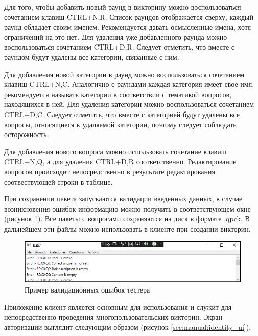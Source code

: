 Для того, чтобы добавить новый раунд в викторину можно воспользоваться сочетанием клавиш CTRL+N,R. Список раундов отображается сверху, каждый раунд обладает своим именем. Рекомендуется давать осмысленные
имена, хотя ограничений на это нет. Для удаления уже добавленного раунда можно воспользоваться сочетанием CTRL+D,R. Следует отметить, что вместе с раундом будут удалены все категории, связанные с ним.

Для добавления новой категории в раунд можно воспользоваться сочетанием клавиш CTRL+N,C. Аналогично с раундами каждая категория имеет свое имя,
рекомендуется называть категории в соответствии с тематикой вопросов, находящихся в ней. Для удаления категории можно воспользоваться сочетанием CTRL+D,C. Следует отметить,
что вместе с категорией будут удалены все вопросы, относящиеся к удаляемой категории, поэтому следует соблюдать осторожность. 

Для добавления нового вопроса можно использовать сочетание клавиш CTRL+N,Q, а для удаления CTRL+D,R соответственно. Редактирование вопросов происходит непосредственно
в результате редактирования соотвествующей строки в таблице.

При сохранении пакета запускаются валидации введенных данных, в случае возникновения ошибок информацию можно получить в соответствующем окне (рисунок \ref{sec:manual:tester_err}).
Все пакеты с вопросами сохраняются на диск в формате .qpck. В дальнейшем эти файлы можно использовать в клиенте при создании викторин.

\begin{figure}[!ht]
    \centering
    \includegraphics[scale=0.75]{attachments/tester_err.png}
    \caption{Пример валидационных ошибок тестера}
    \label{sec:manual:tester_err}
\end{figure}

Приложение-клиент является основным для использования и служит для непосредственно проведения многопользовательских викторин. 
Экран авторизации выглядит следующим образом (рисунок \ref{sec:manual:identity_ui}).

